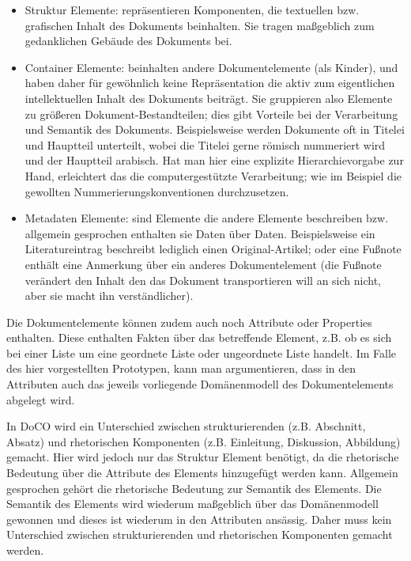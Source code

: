  
\begin{itemize}

\item Struktur Elemente: repräsentieren Komponenten, die textuellen bzw. grafischen Inhalt des Dokuments beinhalten. Sie tragen maßgeblich zum gedanklichen Gebäude des Dokuments bei.
\item Container Elemente: beinhalten andere Dokumentelemente (als Kinder), und haben daher für gewöhnlich keine Repräsentation die aktiv zum eigentlichen intellektuellen Inhalt des Dokuments beiträgt. Sie gruppieren also Elemente zu größeren Dokument-Bestandteilen; dies gibt Vorteile bei der Verarbeitung und Semantik des Dokuments. Beispielsweise werden Dokumente oft in Titelei und Hauptteil unterteilt, wobei die Titelei gerne römisch nummeriert wird und der Hauptteil arabisch. Hat man hier eine explizite Hierarchievorgabe zur Hand, erleichtert das die computergestützte Verarbeitung; wie im Beispiel die gewollten Nummerierungskonventionen durchzusetzen.
\item Metadaten Elemente: sind Elemente die andere Elemente beschreiben bzw. allgemein gesprochen enthalten sie Daten über Daten. Beispielsweise ein Literatureintrag beschreibt lediglich einen Original-Artikel; oder eine Fußnote enthält eine Anmerkung über ein anderes Dokumentelement (die Fußnote verändert den Inhalt den das Dokument transportieren will an sich nicht, aber sie macht ihn verständlicher).
\end{itemize}
 
Die Dokumentelemente können zudem auch noch Attribute oder Properties enthalten. Diese enthalten Fakten über das betreffende Element, z.B. ob es sich bei einer Liste um eine geordnete Liste oder ungeordnete Liste handelt. Im Falle des hier vorgestellten Prototypen, kann man argumentieren, dass in den Attributen auch das jeweils vorliegende Domänenmodell des Dokumentelements abgelegt wird.

 
In DoCO wird ein Unterschied zwischen strukturierenden (z.B. Abschnitt, Absatz) und rhetorischen Komponenten (z.B. Einleitung, Diskussion, Abbildung) gemacht. Hier wird jedoch nur das Struktur Element benötigt, da die rhetorische Bedeutung über die Attribute des Elements hinzugefügt werden kann. Allgemein gesprochen gehört die rhetorische Bedeutung zur Semantik des Elements. Die Semantik des Elements wird wiederum maßgeblich über das Domänenmodell gewonnen und dieses ist wiederum in den Attributen ansässig. Daher muss kein Unterschied zwischen strukturierenden und rhetorischen Komponenten gemacht werden.

